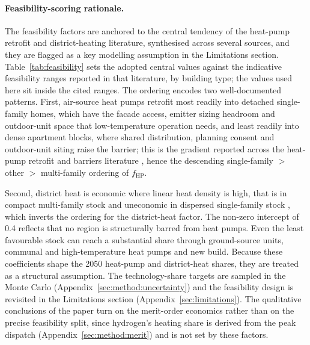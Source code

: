 \paragraph{Feasibility-scoring rationale.} The feasibility factors are anchored to the
central tendency of the heat-pump retrofit and district-heating literature, synthesised
across several sources, and they are flagged as a key modelling assumption in the
Limitations section. Table~\ref{tab:feasibility} sets the adopted central values against
the indicative feasibility ranges reported in that literature, by building type; the
values used here sit inside the cited ranges. The ordering encodes two well-documented
patterns. First, air-source heat pumps retrofit most readily into detached single-family
homes, which have the facade access, emitter sizing headroom and outdoor-unit space that
low-temperature operation needs, and least readily into dense apartment blocks, where
shared distribution, planning consent and outdoor-unit siting raise the barrier; this is
the gradient reported across the heat-pump retrofit and barriers literature
\citep{Gibb2023Coming,Corbett2023Pumping}, hence the descending single-family $>$ other
$>$ multi-family ordering of $f_{\mathrm{HP}}$.

Second, district heat is economic where linear heat density is high, that is in compact
multi-family stock and uneconomic in dispersed single-family stock \citep{Persson2019Heat},
which inverts the ordering for the district-heat factor. The non-zero intercept of 0.4
reflects that no region is structurally barred from heat pumps. Even the least
favourable stock can reach a substantial share through ground-source units, communal and
high-temperature heat pumps and new build. Because these coefficients shape the 2050
heat-pump and district-heat shares, they are treated as a structural assumption. The
technology-share targets are sampled in the Monte Carlo
(Appendix~\ref{sec:method:uncertainty}) and the feasibility design is revisited in the
Limitations section (Appendix~\ref{sec:limitations}). The qualitative conclusions of the
paper turn on the merit-order economics rather than on the precise feasibility split,
since hydrogen's heating share is derived from the peak dispatch
(Appendix~\ref{sec:method:merit}) and is not set by these factors.

